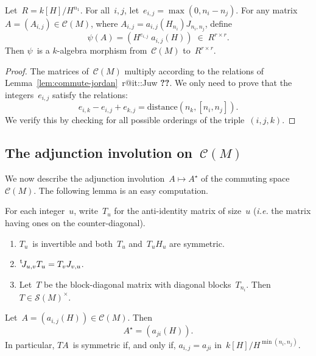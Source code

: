 \documentclass{article}%
\makeatletter
\def\labelenumi{(\roman{enumi})}
\def\itemref#1{\expandafter\ifx\csname r@#1\endcsname\relax
  {\bfseries ??}\else{\setcounter{enumi}{\ref{#1}}\labelenumi}\fi}
\let\ro\mathscr
\def\transpose#1{{\vphantom{#1}}^{\mathrm{t}}\!#1}
\makeatother
\begin{document}
\begin{prop}\label{prop:phantom}%
Let~$R = k[H]/H^{n_1}$. For all~$i, j$, let~$e_{i,j} = \max (0, n_i -
n_j)$. For any matrix~$A = (A_{i,j}) ∈ \ro C(M)$, where $A_{i,j} =
a_{i,j}(H_{n_i}) J_{n_i, n_j}$, define
\begin{equation}
ψ(A) = (H^{e_{i,j}}\; a_{i,j}(H)) \; ∈ \; R^{r×r}.
\end{equation}
Then $ψ$~is a $k$-algebra morphism from~$\ro C(M)$ to~$R^{r×r}$.
\end{prop}

\begin{proof}
The matrices of~$\ro C(M)$ multiply according to the relations of
Lemma~\ref{lem:commute-jordan}~\itemref{it::Juw}. We only need to prove
that the integers~$e_{i,j}$ satisfy the relations:
\begin{equation}\label{eq:integral}
e_{i,k} - e_{i,j} + e_{k,j} = \mathrm{distance} (n_k, [n_i, n_j]).
\end{equation}
We verify this by checking for all possible orderings of the
triple~$(i,j,k)$.
\end{proof}%

\subsection{The adjunction involution on~$\ro C(M)$}
\label{ss:adjunction}
We now describe the adjunction involution~$A ↦ A^{⋆}$ of the commuting
space~$\ro C(M)$. The following lemma is an easy computation.

\begin{lem}\label{lem:big-T}%
For each integer~$u$, write~$T_u$ for the anti-identity matrix of
size~$u$ (\emph{i.e.} the matrix having ones on the counter-diagonal).
\begin{enumerate}
\item $T_u$~is invertible and both~$T_u$ and~$T_u H_u$ are symmetric.
\item $\transpose{J_{u,v}} T_u = T_v J_{v,u}$.
\item Let~$T$ be the block-diagonal matrix with diagonal
blocks~$T_{n_i}$. Then $T ∈ \ro S(M)^{×}$.
\end{enumerate}
\end{lem}
\begin{prop}\label{prop:adjoint}%
Let~$A = (a_{i,j}(H)) ∈ \ro C(M)$. Then \[ A^{⋆} = (a_{ji}(H)). \]
In particular, $TA$~is symmetric if, and only if, $a_{i,j} = a_{ji}$
in~$k[H]/H^{\min (n_i, n_j)}$.
\end{prop}
\end{document}
